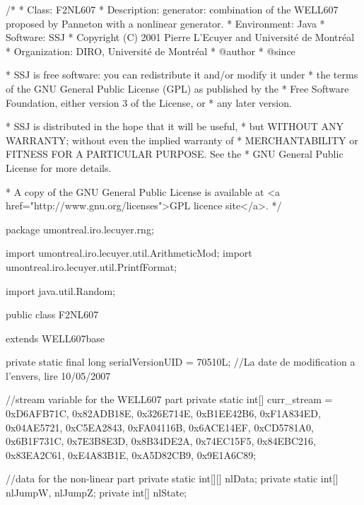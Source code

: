 \begin{code}
\begin{hide}
/*
 * Class:        F2NL607
 * Description:  generator: combination of the WELL607 proposed by
                 Panneton with a nonlinear generator.
 * Environment:  Java
 * Software:     SSJ 
 * Copyright (C) 2001  Pierre L'Ecuyer and Université de Montréal
 * Organization: DIRO, Université de Montréal
 * @author       
 * @since

 * SSJ is free software: you can redistribute it and/or modify it under
 * the terms of the GNU General Public License (GPL) as published by the
 * Free Software Foundation, either version 3 of the License, or
 * any later version.

 * SSJ is distributed in the hope that it will be useful,
 * but WITHOUT ANY WARRANTY; without even the implied warranty of
 * MERCHANTABILITY or FITNESS FOR A PARTICULAR PURPOSE.  See the
 * GNU General Public License for more details.

 * A copy of the GNU General Public License is available at
   <a href="http://www.gnu.org/licenses">GPL licence site</a>.
 */
\end{hide}
package umontreal.iro.lecuyer.rng; \begin{hide}

import umontreal.iro.lecuyer.util.ArithmeticMod;
import umontreal.iro.lecuyer.util.PrintfFormat;

import java.util.Random;
\end{hide}

public class F2NL607 \begin{hide} extends WELL607base {

   private static final long serialVersionUID = 70510L;
   //La date de modification a l'envers, lire 10/05/2007

   //stream variable for the WELL607 part
   private static int[] curr_stream = {0xD6AFB71C, 0x82ADB18E, 0x326E714E,
                                       0xB1EE42B6, 0xF1A834ED, 0x04AE5721,
                                       0xC5EA2843, 0xFA04116B, 0x6ACE14EF,
                                       0xCD5781A0, 0x6B1F731C, 0x7E3B8E3D,
                                       0x8B34DE2A, 0x74EC15F5, 0x84EBC216,
                                       0x83EA2C61, 0xE4A83B1E, 0xA5D82CB9,
                                       0x9E1A6C89};

   //data for the non-linear part
   private static int[][] nlData;
   private static int[] nlJumpW, nlJumpZ;
   private int[] nlState;

}
\end{hide}
\end{code}
